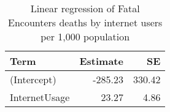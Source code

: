 \begin{table}[ht]
\centering
\begin{tabular}{lrr}
  \hline
Term & Estimate & SE \\ 
  \hline
(Intercept) & -285.23 & 330.42 \\ 
  InternetUsage & 23.27 & 4.86 \\ 
   \hline
\end{tabular}
\caption{Linear regression of Fatal Encounters deaths by internet users per 1,000 population} 
\label{tab:internet}
\end{table}
